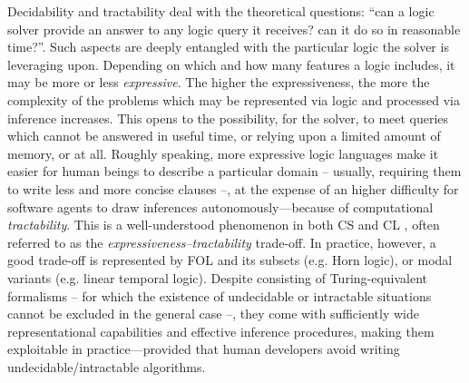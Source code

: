 \documentclass[12pt,a4paper,openright,twoside]{book}
\begin{document}
Decidability and tractability deal with the theoretical questions: ``can a logic solver provide an answer to any logic query it receives? can it do so in reasonable time?''.
%
Such aspects are deeply entangled with the particular logic the solver is leveraging upon.
%
Depending on which and how many features a logic includes, it may be more or less \emph{expressive}.
%
The higher the expressiveness, the more the complexity of the problems which may be represented via logic and processed via inference increases.
%
This opens to the possibility, for the solver, to meet queries which cannot be answered in useful time, or relying upon a limited amount of memory, or at all.
%
Roughly speaking, more expressive logic languages make it easier for human beings to describe a particular domain -- usually, requiring them to write less and more concise clauses --, at the expense of an higher difficulty for software agents to draw inferences autonomously---because of computational \emph{tractability}.
%
This is a well-understood phenomenon in both CS and CL \cite{LevesqueB87, BrachmanL2004}, often referred to as the \emph{expressiveness--tractability} trade-off.
%
In practice, however, a good trade-off is represented by FOL and its subsets (e.g. Horn logic\missingref), or modal variants (e.g. linear temporal logic\missingref).
%
Despite consisting of Turing-equivalent formalisms -- for which the existence of undecidable or intractable situations cannot be excluded in the general case --, they come with sufficiently wide representational capabilities and effective inference procedures, making them exploitable in practice---provided that human developers avoid writing undecidable/intractable algorithms.


\end{document}
